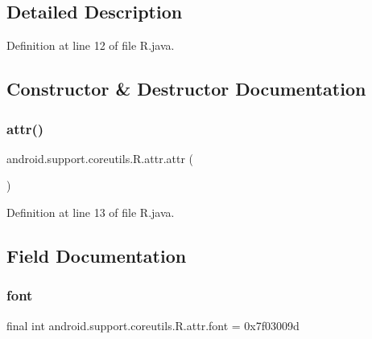 \subsection{Detailed Description}


Definition at line 12 of file R.\+java.



\subsection{Constructor \& Destructor Documentation}
\mbox{\label{classandroid_1_1support_1_1coreutils_1_1_r_1_1attr_a450a5815fd001f8205ca8028dbff5b23}} 
\subsubsection{\texorpdfstring{attr()}{attr()}}
{\footnotesize\ttfamily android.\+support.\+coreutils.\+R.\+attr.\+attr (\begin{DoxyParamCaption}{ }\end{DoxyParamCaption})\hspace{0.3cm}{\ttfamily [private]}}



Definition at line 13 of file R.\+java.


\begin{DoxyCode}{0}

\end{DoxyCode}


\subsection{Field Documentation}
\mbox{\label{classandroid_1_1support_1_1coreutils_1_1_r_1_1attr_a4c489a82e7e8fd81bb99423b6b0f8770}} 
\subsubsection{\texorpdfstring{font}{font}}
{\footnotesize\ttfamily final int android.\+support.\+coreutils.\+R.\+attr.\+font = 0x7f03009d\hspace{0.3cm}{\ttfamily [static]}}



